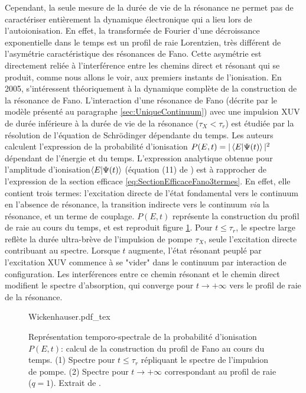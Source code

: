 Cependant, la seule mesure de la durée de vie de la résonance ne permet pas de caractériser entièrement la dynamique électronique qui a lieu lors de l'autoionisation. En effet, la transformée de Fourier d'une décroissance exponentielle dans le temps est un profil de raie Lorentzien, très différent de l'asymétrie caractéristique des résonances de Fano. Cette asymétrie est directement reliée à l'interférence entre les chemins direct et résonant qui se produit, comme nous allons le voir, aux premiers instants de l'ionisation. En 2005,  s'intéressent théoriquement à la dynamique complète de la construction de la résonance de Fano. L'interaction d'une résonance de Fano (décrite par le modèle présenté au paragraphe \ref{sec:UniqueContinuum}) avec une impulsion XUV de durée inférieure à la durée de vie de la résonance ($\tau_X < \tau_r$) est étudiée par la résolution de l'équation de Schrödinger dépendante du temps. Les auteurs calculent l'expression de la probabilité d'ionisation $P(E, t) = |\braket{E|\Psi (t)}|^2$ dépendant de l'énergie et du temps. L'expression analytique obtenue pour l'amplitude d'ionisation$\braket{E|\Psi (t)}$ (équation (11) de ) est à rapprocher de l'expression de la section efficace \ref{eq:SectionEfficaceFano3termes}. En effet, elle contient trois termes: l'excitation directe de l'état fondamental vers le continuum en l'absence de résonance, la transition indirecte vers le continuum \textit{via} la résonance, et un terme de couplage. $P(E, t)$ représente la construction du profil de raie au cours du temps, et est reproduit figure \ref{fig:Wickenhauser}. Pour $t \leq \tau_r$, le spectre large reflète la durée ultra-brève de l'impulsion de pompe $\tau_X$, seule l'excitation directe contribuant au spectre. Lorsque $t$ augmente, l'état résonant peuplé par l'excitation XUV commence à se "vider" dans le continuum par interaction de configuration. Les interférences entre ce chemin résonant et le chemin direct modifient le spectre d'absorption, qui converge pour $t \rightarrow + \infty$ vers le profil de raie de la résonance. 

\begin{figure}[h]
\centering
\def\svgwidth{0.6\textwidth}
{Wickenhauser.pdf_tex}
\caption{Représentation temporo-spectrale de la probabilité d'ionisation $P(E, t)$: calcul de la construction du profil de Fano au cours du temps. (1) Spectre pour $t \leq \tau_r$ répliquant le spectre de l'impulsion de pompe. (2) Spectre pour $t \rightarrow + \infty$ correspondant au profil de raie ($q = 1$). Extrait de .}
\label{fig:Wickenhauser}
\end{figure}

